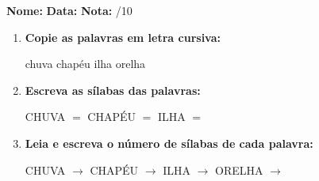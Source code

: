 \begin{exercicio}



\noindent\textbf{Nome:} \underline{\hspace{3.2cm}} \quad \textbf{Data:} \underline{\hspace{1.6cm}} \quad \textbf{Nota:} \underline{\hspace{0.9cm}}/10


\begin{enumerate}

  \item \textbf{Copie as palavras em letra cursiva:}
  \begin{center}
  chuva \quad chapéu \quad ilha \quad orelha
  \end{center}
  \begin{center}
  \underline{\hspace{2.4cm}} \quad \underline{\hspace{2.4cm}} \quad \underline{\hspace{2.4cm}} \quad \underline{\hspace{2.4cm}}
  \end{center}

  \item \textbf{Escreva as sílabas das palavras:}
  \begin{center}
  CHUVA $=$ \underline{\hspace{1.5cm}} \underline{\hspace{1.5cm}} \quad CHAPÉU $=$ \underline{\hspace{1.5cm}} \underline{\hspace{1.5cm}} \quad ILHA $=$ \underline{\hspace{1.5cm}} \underline{\hspace{1.5cm}}
  \end{center}

  \item \textbf{Leia e escreva o número de sílabas de cada palavra:}
  \begin{center}
  CHUVA $\rightarrow$ \underline{\hspace{0.9cm}} \quad CHAPÉU $\rightarrow$ \underline{\hspace{0.9cm}} \quad ILHA $\rightarrow$ \underline{\hspace{0.9cm}} \quad ORELHA $\rightarrow$ \underline{\hspace{0.9cm}}
  \end{center}


\end{enumerate}
\end{exercicio}

